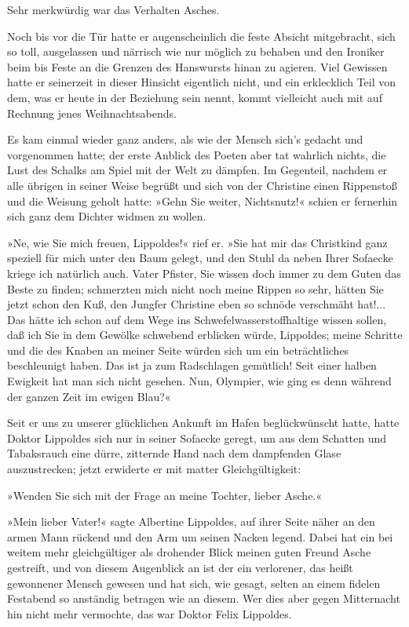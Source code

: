Sehr merkwürdig war das Verhalten Asches.

Noch bis vor die Tür hatte er augenscheinlich die feste Absicht
mitgebracht, sich so toll, ausgelassen und närrisch wie nur möglich
zu behaben und den Ironiker beim bis Feste an die Grenzen des
Hanswursts hinan zu agieren. Viel Gewissen hatte er seinerzeit in
dieser Hinsicht eigentlich nicht, und ein erklecklich Teil von dem,
was er heute in der Beziehung sein nennt, kommt vielleicht auch mit
auf Rechnung jenes Weihnachtsabends.

Es kam einmal wieder ganz anders, als wie der Mensch sich's gedacht
und vorgenommen hatte; der erste Anblick des Poeten aber tat
wahrlich nichts, die Lust des Schalks am Spiel mit der Welt zu
dämpfen. Im Gegenteil, nachdem er alle übrigen in seiner Weise
begrüßt und sich von der Christine einen Rippenstoß und die Weisung
geholt hatte: »Gehn Sie weiter, Nichtsnutz!« schien er fernerhin
sich ganz dem Dichter widmen zu wollen.

»Ne, wie Sie mich freuen, Lippoldes!« rief er. »Sie hat mir das
Christkind ganz speziell für mich unter den Baum gelegt, und den
Stuhl da neben Ihrer Sofaecke kriege ich natürlich auch. Vater
Pfister, Sie wissen doch immer zu dem Guten das Beste zu finden;
schmerzten mich nicht noch meine Rippen so sehr, hätten Sie jetzt
schon den Kuß, den Jungfer Christine eben so schnöde verschmäht
hat!... Das hätte ich schon auf dem Wege ins
Schwefelwasserstoffhaltige wissen sollen, daß ich Sie in dem
Gewölke schwebend erblicken würde, Lippoldes; meine Schritte und
die des Knaben an meiner Seite würden sich um ein beträchtliches
beschleunigt haben. Das ist ja zum Radschlagen gemütlich! Seit
einer halben Ewigkeit hat man sich nicht gesehen. Nun, Olympier,
wie ging es denn während der ganzen Zeit im ewigen Blau?«

Seit er uns zu unserer glücklichen Ankunft im Hafen beglückwünscht
hatte, hatte Doktor Lippoldes sich nur in seiner Sofaecke geregt,
um aus dem Schatten und Tabaksrauch eine dürre, zitternde Hand nach
dem dampfenden Glase auszustrecken; jetzt erwiderte er mit matter
Gleichgültigkeit:

»Wenden Sie sich mit der Frage an meine Tochter, lieber Asche.«

»Mein lieber Vater!« sagte Albertine Lippoldes, auf ihrer Seite
näher an den armen Mann rückend und den Arm um seinen Nacken
legend. Dabei hat ein bei weitem mehr gleichgültiger als drohender
Blick meinen guten Freund Asche gestreift, und von diesem
Augenblick an ist der ein verlorener, das heißt gewonnener Mensch
gewesen und hat sich, wie gesagt, selten an einem fidelen Festabend
so anständig betragen wie an diesem. Wer dies aber gegen
Mitternacht hin nicht mehr vermochte, das war Doktor Felix
Lippoldes.

